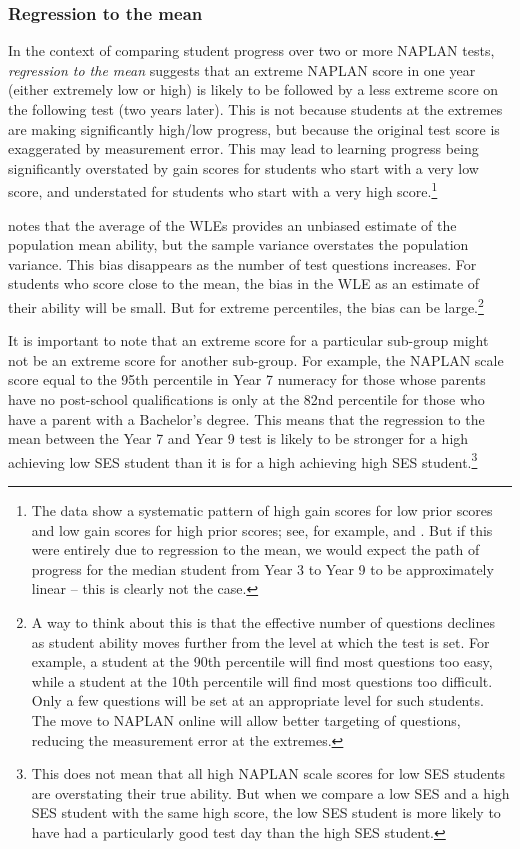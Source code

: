 \subsubsection*{Regression to the mean}

In the context of comparing student progress over two or more NAPLAN tests, \textit{regression to the mean} suggests that an extreme NAPLAN score in one year (either extremely low or high) is likely to be followed by a less extreme score on the following test (two years later). This is not because students at the extremes are making significantly high/low progress, but because the original test score is exaggerated by measurement error. This may lead to learning progress being significantly overstated by gain scores for students who start with a very low score, and understated for students who start with a very high score.\footnote{The data show a systematic pattern of high gain scores for low prior scores and low gain scores for high prior scores; see, for example,  and . But if this were entirely due to regression to the mean, we would expect the path of progress for the median student from Year 3 to Year 9 to be approximately linear -- this is clearly not the case.}

\textcite{wu2005} notes that the average of the WLEs provides an unbiased estimate of the population mean ability, but the sample variance overstates the population variance. This bias disappears as the number of test questions increases. For students who score close to the mean, the bias in the WLE as an estimate of their ability will be small. But for extreme percentiles, the bias can be large.\footnote{A way to think about this is that the effective number of questions declines as student ability moves further from the level at which the test is set. For example, a student at the 90th percentile will find most questions too easy, while a student at the 10th percentile will find most questions too difficult. Only a few questions will be set at an appropriate level for such students. The move to NAPLAN online will allow better targeting of questions, reducing the measurement error at the extremes.}

It is important to note that an extreme score for a particular sub-group might not be an extreme score for another sub-group. For example, the NAPLAN scale score equal to the 95th percentile in Year 7 numeracy for those whose parents have no post-school qualifications is only at the 82nd percentile for those who have a parent with a Bachelor's degree. This means that the regression to the mean between the Year 7 and Year 9 test is likely to be stronger for a high achieving low SES student than it is for a high achieving high SES student.\footnote{This does not mean that all high NAPLAN scale scores for low SES students are overstating their true ability. But when we compare a low SES and a high SES student with the same high score, the low SES student is more likely to have had a particularly good test day than the high SES student.}

